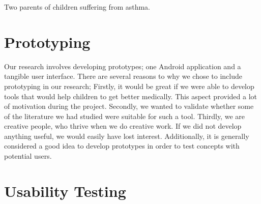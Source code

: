 Two parents of children suffering from asthma.    


\section{Prototyping}
\label{sec:researchmethodprototyping}
Our research involves developing prototypes; one Android application and a tangible user interface. There are several reasons to why we chose to include prototyping in our research; Firstly, it would be great if we were able to develop tools that would help children to get better medically. This aspect provided a lot of motivation during the project. Secondly, we wanted to validate whether some of the literature we had studied were suitable for such a tool. Thirdly, we are creative people, who thrive when we do creative work. If we did not develop anything useful, we would easily have lost interest. Additionally, it is generally considered a good idea to develop prototypes in order to test concepts with potential users\cite{dumas1995practical}.
      
\section{Usability Testing}
\label{sec:usabilitytesting}
 